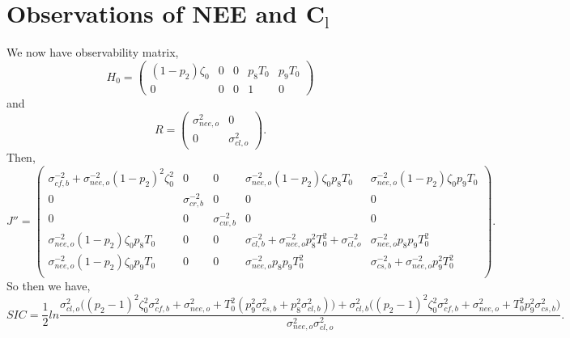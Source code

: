\documentclass[11pt]{article}
\begin{document}
\section*{Observations of NEE and C$_\text{l}$}
We now have observability matrix,
\[
H_{0} = \begin{pmatrix}
(1-p_{2})\zeta_0 & 0 & 0 & p_{8}T_{0} & p_{9}T_{0}\\
0 & 0 & 0 & 1 & 0
\end{pmatrix}
\]
and 
\[
R= \begin{pmatrix}
\sigma_{nee,o}^{2} & 0 \\
0 & \sigma_{cl,o}^{2}
\end{pmatrix}.
\]
Then,
\[
J'' = \begin{pmatrix}
\sigma_{cf,b}^{-2}+\sigma_{nee,o}^{-2}(1-p_{2})^{2}\zeta_0^{2} & 0 & 0 & \sigma_{nee,o}^{-2}(1-p_{2})\zeta_0 p_{8}T_0 & \sigma_{nee,o}^{-2}(1-p_{2})\zeta_0 p_{9}T_0 \\
0 & \sigma_{cr,b}^{-2} & 0 & 0 & 0 \\
0 & 0 & \sigma_{cw,b}^{-2} & 0 & 0 \\
\sigma_{nee,o}^{-2}(1-p_{2})\zeta_0 p_{8}T_0 & 0 & 0 & \sigma_{cl,b}^{-2}+\sigma_{nee,o}^{-2}p_{8}^2 T_0^2+\sigma_{cl,o}^{-2} & \sigma_{nee,o}^{-2}p_{8}p_{9} T_0^2 \\
\sigma_{nee,o}^{-2}(1-p_{2})\zeta_0 p_{9}T_0 & 0 & 0 & \sigma_{nee,o}^{-2}p_{8}p_{9} T_0^2 & \sigma_{cs,b}^{-2}+\sigma_{nee,o}^{-2}p_{9}^2 T_0^2 \\
\end{pmatrix}.
\]
So then we have,
\[
SIC = \frac{1}{2}ln\frac{\sigma_{cl,o}^2\big((p_{2}-1)^{2}\zeta_0^{2}\sigma_{cf,b}^{2}+\sigma_{nee,o}^{2}+T_{0}^2(p_{9}^2\sigma_{cs,b}^2+p_8^2\sigma_{cl,b}^2)\big)+\sigma_{cl,b}^2\big((p_{2}-1)^{2}\zeta_0^{2}\sigma_{cf,b}^{2}+\sigma_{nee,o}^{2}+T_{0}^2 p_{9}^2\sigma_{cs,b}^2\big)}{\sigma_{nee,o}^{2}\sigma_{cl,o}^2}.
\]
\end{document}
